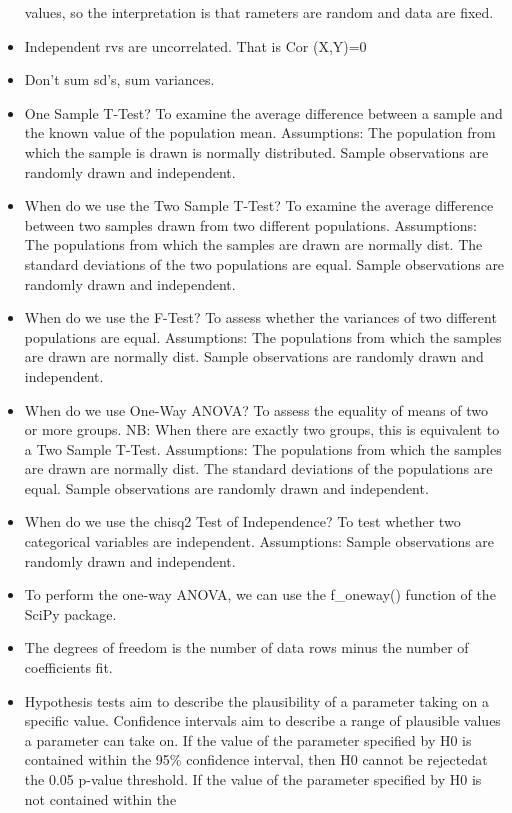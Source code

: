 \documentclass[]{book}
\begin{document}
\begin{itemize}
  values, so the interpretation is that rameters are random and data are
  fixed.
\item
  Independent rvs are uncorrelated. That is Cor (X,Y)=0
\item
  Don't sum sd's, sum variances.
\item
  One Sample T-Test? To examine the average difference between a sample
  and the known value of the population mean. Assumptions: The
  population from which the sample is drawn is normally distributed.
  Sample observations are randomly drawn and independent.
\item
  When do we use the Two Sample T-Test? To examine the average
  difference between two samples drawn from two different populations.
  Assumptions: The populations from which the samples are drawn are
  normally dist. The standard deviations of the two populations are
  equal. Sample observations are randomly drawn and independent.
\item
  When do we use the F-Test? To assess whether the variances of two
  different populations are equal. Assumptions: The populations from
  which the samples are drawn are normally dist. Sample observations are
  randomly drawn and independent.
\item
  When do we use One-Way ANOVA? To assess the equality of means of two
  or more groups. NB: When there are exactly two groups, this is
  equivalent to a Two Sample T-Test. Assumptions: The populations from
  which the samples are drawn are normally dist. The standard deviations
  of the populations are equal. Sample observations are randomly drawn
  and independent.
\item
  When do we use the chisq2 Test of Independence? To test whether two
  categorical variables are independent. Assumptions: Sample
  observations are randomly drawn and independent.
\item
  To perform the one-way ANOVA, we can use the f\_oneway() function of
  the SciPy package.
\item
  The degrees of freedom is the number of data rows minus the number of
  coefficients fit.
\item
  Hypothesis tests aim to describe the plausibility of a parameter
  taking on a specific value. Confidence intervals aim to describe a
  range of plausible values a parameter can take on. If the value of the
  parameter specified by H0 is contained within the 95\% confidence
  interval, then H0 cannot be rejectedat the 0.05 p-value threshold. If
  the value of the parameter specified by H0 is not contained within the

\end{itemize}
\end{document}
